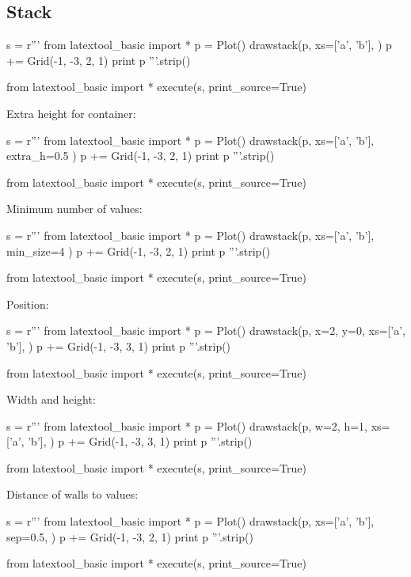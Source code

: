 \subsection{Stack}

\begin{python}
s = r'''
from latextool_basic import *
p = Plot()
drawstack(p,
  xs=['a', 'b'], 
  )
p += Grid(-1, -3, 2, 1)
print p
'''.strip()

from latextool_basic import *
execute(s, print_source=True)
\end{python}

\newpage
Extra height for container:
\begin{python}
s = r'''
from latextool_basic import *
p = Plot()
drawstack(p,
  xs=['a', 'b'],
  extra_h=0.5
  )
p += Grid(-1, -3, 2, 1)
print p
'''.strip()

from latextool_basic import *
execute(s, print_source=True)
\end{python}

\newpage
Minimum number of values:

\begin{python}
s = r'''
from latextool_basic import *
p = Plot()
drawstack(p,
  xs=['a', 'b'],
  min_size=4
  )
p += Grid(-1, -3, 2, 1)
print p
'''.strip()

from latextool_basic import *
execute(s, print_source=True)
\end{python}


\newpage
Position:

\begin{python}
s = r'''
from latextool_basic import *
p = Plot()
drawstack(p,
  x=2, y=0,
  xs=['a', 'b'],
  )
p += Grid(-1, -3, 3, 1)
print p
'''.strip()

from latextool_basic import *
execute(s, print_source=True)
\end{python}

\newpage
Width and height:

\begin{python}
s = r'''
from latextool_basic import *
p = Plot()
drawstack(p,
  w=2, h=1, 
  xs=['a', 'b'],
  )
p += Grid(-1, -3, 3, 1)
print p
'''.strip()

from latextool_basic import *
execute(s, print_source=True)
\end{python}




\newpage

Distance of walls to values:
\begin{python}
s = r'''
from latextool_basic import *
p = Plot()
drawstack(p,
  xs=['a', 'b'],
  sep=0.5, 
  )
p += Grid(-1, -3, 2, 1)
print p
'''.strip()

from latextool_basic import *
execute(s, print_source=True)
\end{python}


